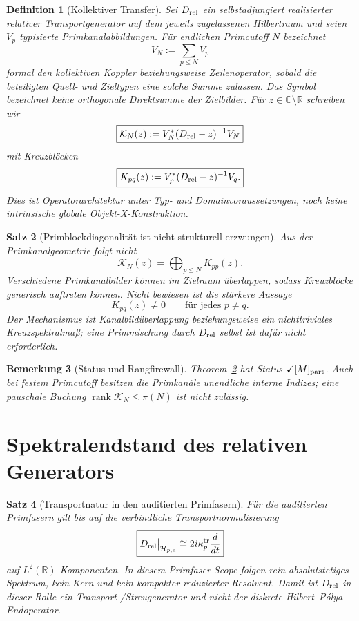 \documentclass[11pt,a4paper]{amsart}
\newtheorem{theorem}{Satz}[section]
\newtheorem{definition}[theorem]{Definition}
\newtheorem{remark}[theorem]{Bemerkung}
\newcommand{\stMpart}{\ensuremath{\checkmark[M]_{\rm part}}}
\begin{document}
\begin{definition}[Kollektiver Transfer]\label{def:collective-transfer}
Sei $D_{\rm rel}$ ein selbstadjungiert realisierter relativer
Transportgenerator auf dem jeweils zugelassenen Hilbertraum und seien $V_p$
typisierte Primkanalabbildungen. Für endlichen Primcutoff $N$ bezeichnet
\[
\boxed{V_N:=\sum_{p\le N}V_p}
\]
formal den kollektiven Koppler beziehungsweise Zeilenoperator, sobald die
beteiligten Quell- und Zieltypen eine solche Summe zulassen. Das Symbol
bezeichnet keine orthogonale Direktsumme der Zielbilder. Für
$z\in\mathbb C\setminus\mathbb R$ schreiben wir
\[
\boxed{\mathcal K_N(z):=V_N^*(D_{\rm rel}-z)^{-1}V_N}
\]
mit Kreuzblöcken
\[
\boxed{K_{pq}(z):=V_p^*(D_{\rm rel}-z)^{-1}V_q.}
\]
Dies ist Operatorarchitektur unter Typ- und Domainvoraussetzungen, noch keine
intrinsische globale Objekt-X-Konstruktion.
\end{definition}

\begin{theorem}[Primblockdiagonalität ist nicht strukturell erzwungen]\label{thm:cross-blocks}
Aus der Primkanalgeometrie folgt nicht
\[
\mathcal K_N(z)=\bigoplus_{p\le N}K_{pp}(z).
\]
Verschiedene Primkanalbilder können im Zielraum überlappen, sodass Kreuzblöcke
generisch auftreten können. Nicht bewiesen ist die stärkere Aussage
\[
K_{pq}(z)\neq0\qquad\text{für jedes }p\neq q.
\]
Der Mechanismus ist Kanalbildüberlappung beziehungsweise ein nichttriviales
Kreuzspektralmaß; eine Primmischung durch $D_{\rm rel}$ selbst ist dafür nicht
erforderlich.
\end{theorem}

\begin{remark}[Status und Rangfirewall]
Theorem~\ref{thm:cross-blocks} hat Status \stMpart. Auch bei festem Primcutoff
besitzen die Primkanäle unendliche interne Indizes; eine pauschale Buchung
$\operatorname{rank}\mathcal K_N\le\pi(N)$ ist nicht zulässig.
\end{remark}

\section{Spektralendstand des relativen Generators}

\begin{theorem}[Transportnatur in den auditierten Primfasern]\label{thm:transport}
Für die auditierten Primfasern gilt bis auf die verbindliche
Transportnormalisierung
\[
\boxed{D_{\rm rel}\big|_{\mathcal H_{p,a}}\cong
2i\kappa_p^{\rm tr}\frac d{dt}}
\]
auf $L^2(\mathbb R)$-Komponenten. In diesem Primfaser-Scope folgen rein
absolutstetiges Spektrum, kein Kern und kein kompakter reduzierter Resolvent.
Damit ist $D_{\rm rel}$ in dieser Rolle ein Transport-/Streugenerator und nicht
der diskrete Hilbert--Pólya-Endoperator.
\end{theorem}
\end{document}
